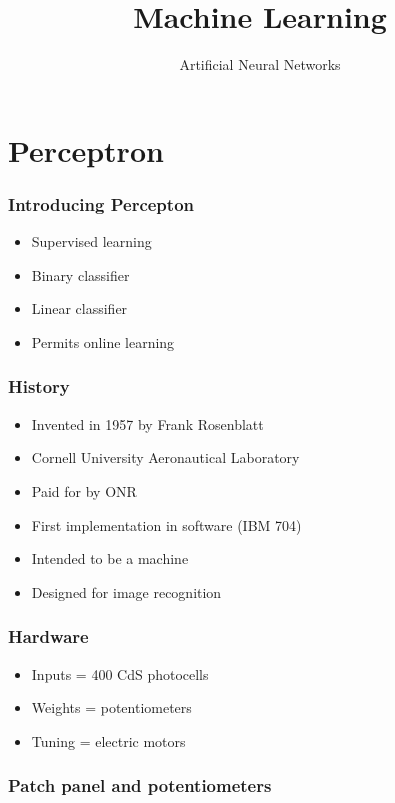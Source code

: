 
\title
{Machine Learning}
\subtitle{Artificial Neural Networks}




\begin{frame}
  \titlepage
\end{frame}

\section{Perceptron}

\begin{frame}
  \frametitle{Introducing Percepton}
  \begin{itemize}
  \item Supervised learning
  \item Binary classifier
  \item Linear classifier
  \item Permits online learning
  \end{itemize}
\end{frame}

\begin{frame}
  \frametitle{History}
  \begin{itemize}
  \item Invented in 1957 by Frank Rosenblatt
  \item Cornell University Aeronautical Laboratory
  \item Paid for by ONR
  \item First implementation in software (IBM 704)
  \item Intended to be a machine
  \item Designed for image recognition
  \end{itemize}
\end{frame}

\begin{frame}
  \frametitle{Hardware}
  \begin{itemize}
  \item Inputs = 400 CdS photocells
  \item Weights = potentiometers
  \item Tuning = electric motors
  \end{itemize}
\end{frame}

\begin{frame}
  \frametitle{Patch panel and potentiometers}
\end{frame}

